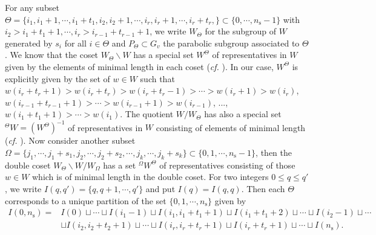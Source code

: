 \documentclass[12pt,oneside,reqno]{amsart}
\theoremstyle{plain}
\begin{document}
	For any subset
	$\Theta
	=\{i_1,i_1+1,\cdots,i_1+t_1,i_2,i_2+1,\cdots,
	i_r,i_r+1,\cdots,i_r+t_r,\}
	\subset\{0,\cdots,n_\mathrm{s}-1\}
	$
	with
	$i_2>i_1+t_1+1,\cdots,i_r>i_{r-1}+t_{r-1}+1$,
	we write
	$W_\Theta$
	for the subgroup of $W$ generated by
	$s_i$ for all $i\in\Theta$
	and
	$P_\Theta
	\subset
	G_v$
	the parabolic subgroup
	associated to $\Theta$.
	We know that the coset
	$W_\Theta\backslash W$
	has a special set
	$W^\Theta$
	of representatives in
	$W$ given by the elements of minimal length in each coset
	(\emph{cf.}
	\cite[Lemma 1.1.2]{Casselman1995}).
	In our case,
	$W^\Theta$
	is explicitly given by the set of
	$w\in W$
	such that
	$w(i_r+t_r+1)>w(i_r+t_r)>w(i_r+t_r-1)>\cdots>w(i_r+1)>w(i_r)$,
	$w(i_{r-1}+t_{r-1}+1)>\cdots>w(i_{r-1}+1)>w(i_{r-1})$,
	...,
	$w(i_1+t_1+1)>\cdots>w(i_1)$.
	The quotient
	$W/W_\Theta$
	has also a special set
	$^\Theta W=(W^\Theta)^{-1}$
	of representatives in $W$
	consisting of elements of minimal length
	(\emph{cf.}
	\cite[Proposition 8.1.4\& (2.11)]{BjonerBrenti2005}).
	Now consider another subset
	$\Omega
	=\{j_1,\cdots,j_1+s_1,j_2,\cdots,j_2+s_2,\cdots,j_k,\cdots,j_k+s_k\}
	\subset
	\{0,1,\cdots,n_\mathrm{s}-1\}$,
	then
	the double coset
	$W_\Theta\backslash W/W_\Omega$
	has a set
	$^\Omega W^\Theta$
	of representatives consisting of those
	$w\in W$
	which is of minimal length in the double coset.
	For two integers
	$0\le
	q\le q'$,
	we write
	$I(q,q')=\{q,q+1,\cdots,q'\}$
	and put
	$I(q)=I(q,q)$.
	Then
	each $\Theta$
	corresponds to a unique partition of
	the set
	$\{0,1,\cdots,n_\mathrm{s}\}$
	given by
	\begin{align*}
		I(0,n_\mathrm{s})
		=
		&
		I(0)
		\sqcup
		\cdots
		\sqcup
		I(i_1-1)
		\sqcup
		I(i_1,i_1+t_1+1)
		\sqcup
		I(i_1+t_1+2)
		\sqcup
		\cdots
		\sqcup
		I(i_2-1)
		\sqcup
		\cdots
		\\
		&
		\sqcup
		I(i_2,i_2+t_2+1)
		\sqcup
		\cdots
		\sqcup
		I(i_r,i_r+t_r+1)
		\sqcup
		I(i_r+t_r+1)
		\sqcup
		\cdots
		\sqcup
		I(n_\mathrm{s}).
	\end{align*}
    
    
    
    
    
\end{document}
